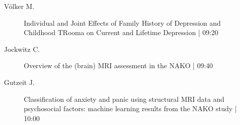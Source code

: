 \begin{symposium}
\begin{description}
                \item [ Völker M.] Individual and Joint Effects of Family History of Depression and Childhood TRooma on Current and Lifetime Depression \textcolor{mygray}{ | 09:20}    
                
                \item [ Jockwitz C.] Overview of the (brain) MRI assessment in the NAKO \textcolor{mygray}{ | 09:40}    
                
                \item [ Gutzeit J.] Classification of anxiety and panic using structural MRI data and psychosocial factors: machine learning results from the NAKO study \textcolor{mygray}{ | 10:00}    
                
            \end{description} 
            \end{symposium}
            